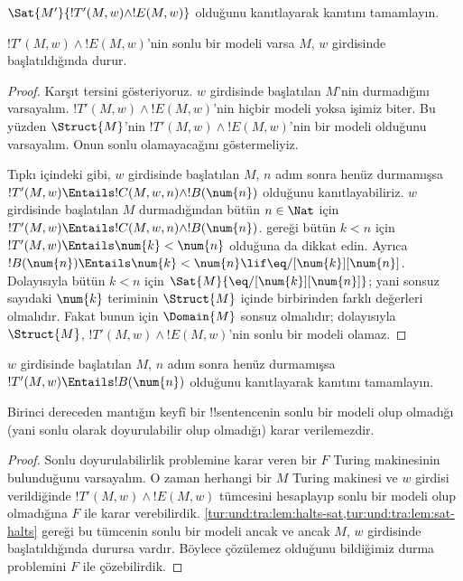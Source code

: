 \documentclass[../../../include/open-logic-section]{subfiles}
\begin{document}
\begin{prob}
  $\Sat{M'}{!T'(M,w)\land !E(M,w)}$ olduğunu kanıtlayarak
   kanıtını tamamlayın.
\end{prob}

\begin{lem}
  $!T'(M,w)\land !E(M,w)$'nin sonlu bir modeli varsa $M$, $w$ girdisinde
  başlatıldığında durur.
\end{lem}

\begin{proof}
  Karşıt tersini gösteriyoruz. $w$ girdisinde başlatılan $M$'nin durmadığını
  varsayalım. $!T'(M,w)\land !E(M,w)$'nin hiçbir modeli yoksa işimiz biter.
  Bu yüzden $\Struct{M}$'nin $!T'(M,w)\land !E(M,w)$'nin bir modeli olduğunu
  varsayalım. Onun sonlu olamayacağını göstermeliyiz.
  
  Tıpkı  içindeki gibi, $w$ girdisinde başlatılan $M$,
  $n$ adım sonra henüz durmamışsa
  $!T'(M,w)\Entails !C(M,w,n)\land !B(\num{n})$ olduğunu kanıtlayabiliriz.
  $w$ girdisinde başlatılan $M$ durmadığından bütün $n\in\Nat$ için
  $!T'(M,w)\Entails !C(M,w,n)\land !B(\num{n})$.
   gereği bütün $k<n$ için
  $!T'(M,w)\Entails \num{k}<\num{n}$ olduğuna da dikkat edin. Ayrıca
  $!B(\num{n})\Entails \num{k}<\num{n}\lif
  \eq/[\num{k}][\num{n}]$. Dolayısıyla bütün $k<n$ için
  $\Sat{M}{\eq/[\num{k}][\num{n}]}$; yani sonsuz sayıdaki $\num{k}$ teriminin
  $\Struct{M}$ içinde birbirinden farklı değerleri olmalıdır. Fakat bunun için
  $\Domain{M}$ sonsuz olmalıdır; dolayısıyla $\Struct{M}$,
  $!T'(M,w)\land !E(M,w)$'nin sonlu bir modeli olamaz.
\end{proof}

\begin{prob}
  $w$ girdisinde başlatılan $M$, $n$ adım sonra henüz durmamışsa
  $!T'(M,w)\Entails !B(\num{n})$ olduğunu kanıtlayarak
   kanıtını tamamlayın.
\end{prob}

\begin{thm}
  Birinci dereceden mantığın keyfî bir !!{sentence}{}nin sonlu bir modeli olup
  olmadığı (yani sonlu olarak doyurulabilir olup olmadığı) karar verilemezdir.
\end{thm}

\begin{proof}
  Sonlu doyurulabilirlik problemine karar veren bir $F$ Turing makinesinin
  bulunduğunu varsayalım. O zaman herhangi bir $M$ Turing makinesi ve $w$
  girdisi verildiğinde $!T'(M,w)\land !E(M,w)$ tümcesini hesaplayıp sonlu bir
  modeli olup olmadığına $F$ ile karar verebilirdik.
  \cref{tur:und:tra:lem:halts-sat,tur:und:tra:lem:sat-halts} gereği bu
  tümcenin sonlu bir modeli ancak ve ancak $M$, $w$ girdisinde başlatıldığında
  durursa vardır. Böylece çözülemez olduğunu bildiğimiz durma problemini $F$
  ile çözebilirdik.
\end{proof}
\end{document}
